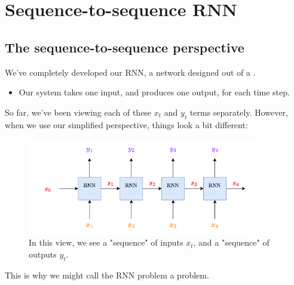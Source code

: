     \pagebreak

\section{Sequence-to-sequence RNN}

    \subsection{The sequence-to-sequence perspective}

        We've completely developed our RNN, a network designed out of a .
    
        \begin{itemize}
            \item Our system takes one input, and produces one output, for each time step.
        \end{itemize}
    
        So far, we've been viewing each of these $x_t$ and $y_t$ terms separately. However, when we use our simplified perspective, things look a bit different:
    
        \begin{figure}[H]
            \centering
            \includegraphics[width=100mm]{images/rnn_images/rnn_simple_layers.png}
            \caption*{In this view, we see a "sequence" of inputs $x_t$, and a "sequence" of outputs $y_t$.}
        \end{figure}
    
        This is why we might call the RNN problem a  problem.\\
    
